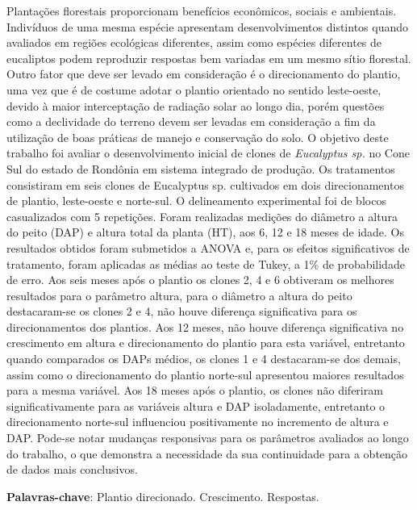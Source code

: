 \documentclass[article,12pt,onesidea,4paper,english,brazil]{abntex2}
\begin{document}
	\noindent Plantações florestais proporcionam benefícios econômicos, sociais e ambientais.
	Indivíduos de uma mesma espécie apresentam desenvolvimentos distintos quando
	avaliados em regiões ecológicas diferentes, assim como espécies diferentes de
	eucaliptos podem reproduzir respostas bem variadas em um mesmo sítio florestal.
	Outro fator que deve ser levado em consideração é o direcionamento do plantio,
	uma vez que é de costume adotar o plantio orientado no sentido leste-oeste, devido
	à maior interceptação de radiação solar ao longo dia, porém questões como a
	declividade do terreno devem ser levadas em consideração a fim da utilização de
	boas práticas de manejo e conservação do solo. O objetivo deste trabalho foi avaliar
	o desenvolvimento inicial de clones de \textit{Eucalyptus sp.} no Cone Sul do estado de
	Rondônia em sistema integrado de produção. Os tratamentos consistiram em seis
	clones de Eucalyptus sp. cultivados em dois direcionamentos de plantio, leste-oeste
	e norte-sul. O delineamento experimental foi de blocos casualizados com 5
	repetições. Foram realizadas medições do diâmetro a altura do peito (DAP) e altura
	total da planta (HT), aos 6, 12 e 18 meses de idade. Os resultados obtidos foram
	submetidos a ANOVA e, para os efeitos significativos de tratamento, foram aplicadas
	as médias ao teste de Tukey, a 1\% de probabilidade de erro. Aos seis meses após o
	plantio os clones 2, 4 e 6 obtiveram os melhores resultados para o parâmetro altura,
	para o diâmetro a altura do peito destacaram-se os clones 2 e 4, não houve
	diferença significativa para os direcionamentos dos plantios. Aos 12 meses, não
	houve diferença significativa no crescimento em altura e direcionamento do plantio
	para esta variável, entretanto quando comparados os DAPs médios, os clones 1 e 4
	destacaram-se dos demais, assim como o direcionamento do plantio norte-sul
	apresentou maiores resultados para a mesma variável. Aos 18 meses após o
	plantio, os clones não diferiram significativamente para as variáveis altura e DAP
	isoladamente, entretanto o direcionamento norte-sul influenciou positivamente no
	incremento de altura e DAP. Pode-se notar mudanças responsivas para os
	parâmetros avaliados ao longo do trabalho, o que demonstra a necessidade da sua
	continuidade para a obtenção de dados mais conclusivos.
	
	\vspace{\onelineskip}
	
	\noindent
	\textbf{Palavras-chave}: Plantio direcionado. Crescimento. Respostas.
	
\end{document}
